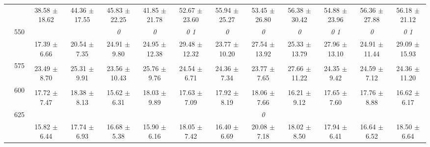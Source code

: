 \begin{table}[h]
{\begin{tabular}{
        ccccccccccccc}
 & & \cellcolor[HTML]{EFEFEF} 38.58 $\pm$ 18.62& \cellcolor[HTML]{EFEFEF} 44.36 $\pm$ 17.55& \cellcolor[HTML]{EFEFEF} 45.83 $\pm$ 22.25& \cellcolor[HTML]{EFEFEF} 41.85 $\pm$ 21.78& \cellcolor[HTML]{EFEFEF} 52.67 $\pm$ 23.60& \cellcolor[HTML]{EFEFEF} 55.94 $\pm$ 25.27& \cellcolor[HTML]{EFEFEF} 53.45 $\pm$ 26.80& \cellcolor[HTML]{EFEFEF} 56.38 $\pm$ 30.42& \cellcolor[HTML]{EFEFEF} 54.88 $\pm$ 23.96& \cellcolor[HTML]{EFEFEF} 56.36 $\pm$ 27.88& \cellcolor[HTML]{EFEFEF} 56.18 $\pm$ 21.12 \\ 
 & \multirow{2}{*}{550}& & & \textit{ 0 }& \textit{ 0 }& \textit{ 0 1 }& \textit{ 0 }& \textit{ 0 }& \textit{ 0 }& \textit{ 0 1 }& \textit{ 0 }& \textit{ 0 1 } \\ 
 & & 17.39 $\pm$ 6.66& 20.54 $\pm$ 7.35& 24.91 $\pm$ 9.80& 24.95 $\pm$ 12.38& 29.48 $\pm$ 12.32& 23.77 $\pm$ 10.20& 27.54 $\pm$ 13.92& 25.33 $\pm$ 13.79& 27.96 $\pm$ 13.10& 24.91 $\pm$ 11.44& 29.09 $\pm$ 15.93 \\ 
 & \multirow{2}{*}{575}& \cellcolor[HTML]{EFEFEF} & \cellcolor[HTML]{EFEFEF} & \cellcolor[HTML]{EFEFEF} & \cellcolor[HTML]{EFEFEF} & \cellcolor[HTML]{EFEFEF} & \cellcolor[HTML]{EFEFEF} & \cellcolor[HTML]{EFEFEF} & \cellcolor[HTML]{EFEFEF} & \cellcolor[HTML]{EFEFEF} & \cellcolor[HTML]{EFEFEF} & \cellcolor[HTML]{EFEFEF}  \\ 
 & & \cellcolor[HTML]{EFEFEF} 23.49 $\pm$ 8.70& \cellcolor[HTML]{EFEFEF} 25.31 $\pm$ 9.91& \cellcolor[HTML]{EFEFEF} 23.56 $\pm$ 10.43& \cellcolor[HTML]{EFEFEF} 25.76 $\pm$ 9.76& \cellcolor[HTML]{EFEFEF} 24.54 $\pm$ 6.71& \cellcolor[HTML]{EFEFEF} 24.36 $\pm$ 7.34& \cellcolor[HTML]{EFEFEF} 23.77 $\pm$ 7.65& \cellcolor[HTML]{EFEFEF} 27.66 $\pm$ 11.22& \cellcolor[HTML]{EFEFEF} 24.35 $\pm$ 9.42& \cellcolor[HTML]{EFEFEF} 24.59 $\pm$ 7.12& \cellcolor[HTML]{EFEFEF} 24.36 $\pm$ 11.20 \\ 
 & \multirow{2}{*}{600}& & & & & & & & & & &  \\ 
 & & 17.72 $\pm$ 7.47& 18.38 $\pm$ 8.13& 15.62 $\pm$ 6.31& 18.03 $\pm$ 9.89& 17.63 $\pm$ 7.09& 17.92 $\pm$ 8.19& 18.06 $\pm$ 7.66& 16.21 $\pm$ 9.12& 17.65 $\pm$ 7.60& 17.76 $\pm$ 8.88& 16.62 $\pm$ 6.17 \\ 
 & \multirow{2}{*}{625}& \cellcolor[HTML]{EFEFEF} & \cellcolor[HTML]{EFEFEF} & \cellcolor[HTML]{EFEFEF} & \cellcolor[HTML]{EFEFEF} & \cellcolor[HTML]{EFEFEF} & \cellcolor[HTML]{EFEFEF} & \cellcolor[HTML]{EFEFEF} \textit{ 0 }& \cellcolor[HTML]{EFEFEF} & \cellcolor[HTML]{EFEFEF} & \cellcolor[HTML]{EFEFEF} & \cellcolor[HTML]{EFEFEF}  \\ 
 & & \cellcolor[HTML]{EFEFEF} 15.82 $\pm$ 6.44& \cellcolor[HTML]{EFEFEF} 17.74 $\pm$ 6.93& \cellcolor[HTML]{EFEFEF} 16.68 $\pm$ 5.38& \cellcolor[HTML]{EFEFEF} 15.90 $\pm$ 6.16& \cellcolor[HTML]{EFEFEF} 18.05 $\pm$ 7.42& \cellcolor[HTML]{EFEFEF} 16.40 $\pm$ 6.69& \cellcolor[HTML]{EFEFEF} 20.08 $\pm$ 7.18& \cellcolor[HTML]{EFEFEF} 18.02 $\pm$ 8.50& \cellcolor[HTML]{EFEFEF} 17.94 $\pm$ 6.41& \cellcolor[HTML]{EFEFEF} 16.64 $\pm$ 6.52& \cellcolor[HTML]{EFEFEF} 18.50 $\pm$ 6.64 \\ 

\end{tabular}}
\end{table}
